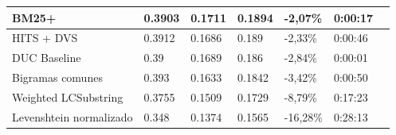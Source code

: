 \documentclass[a4paper]{article}
\begin{document}
\begin{tabular}{ | l | l | l | l | l | l | l | }
	BM25+ & 0.3903 & 0.1711 & 0.1894 & -2,07\% & 0:00:17\\ \hline
	HITS + DVS & 0.3912 & 0.1686 & 0.189 & -2,33\% & 0:00:46\\ \hline
	DUC Baseline & 0.39 & 0.1689 & 0.186 & -2,84\% & 0:00:01\\ \hline
	Bigramas comunes & 0.393 & 0.1633 & 0.1842 & -3,42\% & 0:00:50\\ \hline
	Weighted LCSubstring & 0.3755 & 0.1509 & 0.1729 & -8,79\% & 0:17:23\\ \hline
	Levenshtein normalizado & 0.348 & 0.1374 & 0.1565 & -16,28\% & 0:28:13\\ \hline
\end{tabular}




{}

\end{document}
